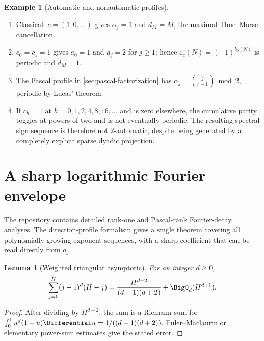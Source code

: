 \documentclass[11pt]{article}
\numberwithin{equation}{section}
\newtheorem{lemma}[theorem]{Lemma}
\theoremstyle{definition}
\newtheorem{example}[theorem]{Example}
\theoremstyle{remark}
\begin{document}
\begin{example}[Automatic and nonautomatic profiles]
\begin{enumerate}[label=\textup{(\alph*)},leftmargin=*]
\item Classical: $c=(1,0,\ldots)$ gives $\alpha_j=1$ and
      $d_M=M$, the maximal Thue--Morse cancellation.
\item $c_0=c_1=1$ gives $a_0=1$ and $a_j=2$ for $j\ge1$; hence
      $\varepsilon_c(N)=(-1)^{b_0(N)}$ is periodic and $d_M=1$.
\item The Pascal profile in \cref{sec:pascal-factorization} has
      $\alpha_j=\binom{j}{r-1}\bmod2$, periodic by Lucas' theorem.
\item If $c_h=1$ at $h=0,1,2,4,8,16,\ldots$ and is zero elsewhere, the
      cumulative parity toggles at powers of two and is not eventually
      periodic.  The resulting spectral sign sequence is therefore not
      $2$-automatic, despite being generated by a completely explicit sparse
      dyadic projection.
\end{enumerate}
\end{example}

\section{A sharp logarithmic Fourier envelope}
\label{sec:fourier-envelope}

The repository contains detailed rank-one and Pascal-rank Fourier-decay
analyses.  The direction-profile formalism gives a single theorem covering
all polynomially growing exponent sequences, with a sharp coefficient that
can be read directly from $a_j$.

\begin{lemma}[Weighted triangular asymptotic]
\label{lem:weighted-triangle}
For an integer $d\ge0$,
\begin{equation}
 \sum_{j=0}^{H}(j+1)^d(H-j)
 =\frac{H^{d+2}}{(d+1)(d+2)}+\BigO_d(H^{d+1}).
 \label{eq:weighted-triangle}
\end{equation}
\end{lemma}

\begin{proof}
After dividing by $H^{d+2}$, the sum is a Riemann sum for
$\int_0^1u^d(1-u)\Differential u=1/((d+1)(d+2))$.  Euler--Maclaurin or elementary
power-sum estimates give the stated error.
\end{proof}
\end{document}
